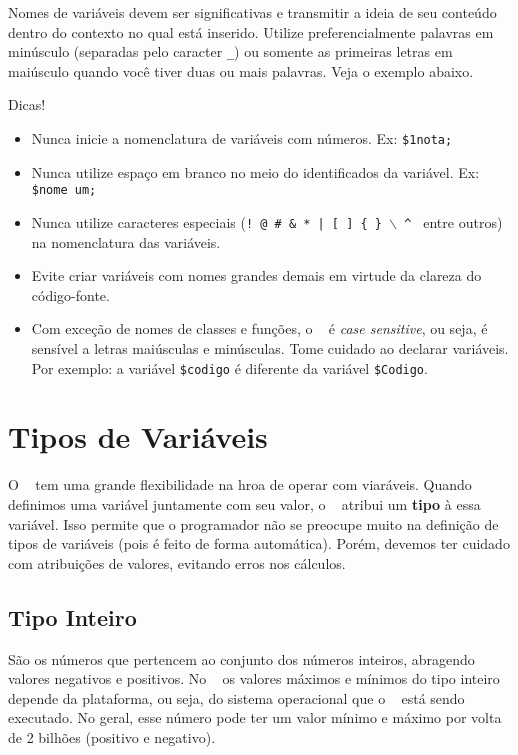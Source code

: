 Nomes de variáveis devem ser significativas e transmitir a ideia de seu conteúdo 
dentro do contexto no qual está inserido.
Utilize preferencialmente palavras em minúsculo (separadas pelo caracter \texttt{\_}) ou 
somente as primeiras letras em maiúsculo quando você tiver duas ou mais palavras. 
Veja o exemplo abaixo. 



Dicas! \newline
\begin{itemize}
    \item Nunca inicie a nomenclatura de variáveis com números. Ex: \texttt{\$1nota;}
    \item Nunca utilize espaço em branco no meio do identificados da variável. Ex: \texttt{\$nome um;}
    \item Nunca utilize caracteres especiais (\texttt{! @ \# \& * | [ ] \{ \} $\backslash$ \^ } 
    entre outros) na nomenclatura das variáveis.
    \item Evite criar variáveis com nomes grandes demais em virtude da clareza do código-fonte.
    \item Com exceção de nomes de classes e funções, o \php~ é \textit{case sensitive}, ou seja, 
    é sensível a letras maiúsculas e minúsculas. Tome cuidado ao declarar variáveis. Por exemplo: 
    a variável \texttt{\$codigo} é diferente da variável \texttt{\$Codigo}.
\end{itemize}


\section{Tipos de Variáveis}
\label{tipos-de-variaveis}

O \php~ tem uma grande flexibilidade na hroa de operar com viaráveis. Quando definimos
uma variável juntamente com seu valor, o \php~ atribui um \textbf{tipo} à essa variável.
Isso permite que o programador não se preocupe muito na definição de tipos de 
variáveis (pois é feito de forma automática). Porém, devemos ter cuidado com atribuições
de valores, evitando erros nos cálculos.

\subsection{Tipo Inteiro}
\label{tipo-inteiro}
São os números que pertencem ao conjunto dos números inteiros, abragendo valores negativos
e positivos. No \php~ os valores máximos e mínimos do tipo inteiro depende da plataforma,
ou seja, do sistema operacional que o \php~ está sendo executado. No geral, esse número
pode ter um valor mínimo e máximo por volta de 2 bilhões (positivo e negativo).

